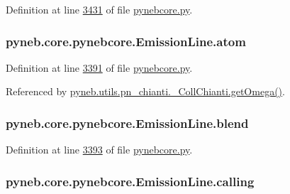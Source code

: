 Definition at line \hyperlink{pynebcore_8py_source_l03431}{3431} of file \hyperlink{pynebcore_8py_source}{pynebcore.\-py}.

\hypertarget{classpyneb_1_1core_1_1pynebcore_1_1_emission_line_a4792ac5b02cda998caaf42203e4541e9}{
\subsubsection[{atom}]{\setlength{\rightskip}{0pt plus 5cm}pyneb.\-core.\-pynebcore.\-Emission\-Line.\-atom}}\label{classpyneb_1_1core_1_1pynebcore_1_1_emission_line_a4792ac5b02cda998caaf42203e4541e9}


Definition at line \hyperlink{pynebcore_8py_source_l03391}{3391} of file \hyperlink{pynebcore_8py_source}{pynebcore.\-py}.



Referenced by \hyperlink{pn__chianti_8py_source_l00507}{pyneb.\-utils.\-pn\-\_\-chianti.\-\_\-\-Coll\-Chianti.\-get\-Omega()}.

\hypertarget{classpyneb_1_1core_1_1pynebcore_1_1_emission_line_a44f73379aadc3e6231d66dd7a6ebae6b}{
\subsubsection[{blend}]{\setlength{\rightskip}{0pt plus 5cm}pyneb.\-core.\-pynebcore.\-Emission\-Line.\-blend}}\label{classpyneb_1_1core_1_1pynebcore_1_1_emission_line_a44f73379aadc3e6231d66dd7a6ebae6b}


Definition at line \hyperlink{pynebcore_8py_source_l03393}{3393} of file \hyperlink{pynebcore_8py_source}{pynebcore.\-py}.

\hypertarget{classpyneb_1_1core_1_1pynebcore_1_1_emission_line_ac14a01c0f8aac44c5e2381cadfacf2cf}{
\subsubsection[{calling}]{\setlength{\rightskip}{0pt plus 5cm}pyneb.\-core.\-pynebcore.\-Emission\-Line.\-calling}}\label{classpyneb_1_1core_1_1pynebcore_1_1_emission_line_ac14a01c0f8aac44c5e2381cadfacf2cf}


